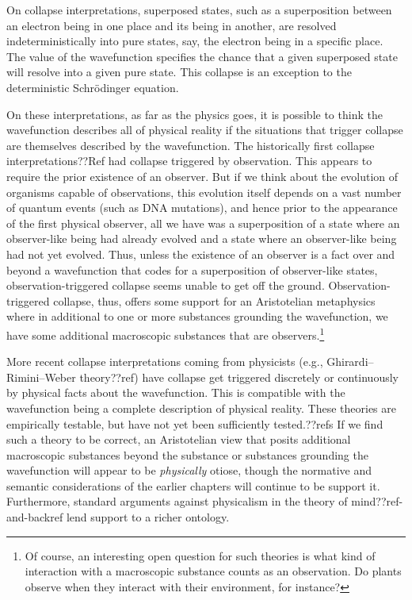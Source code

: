 On collapse interpretations, superposed states, such as a superposition between an electron being in one place and its 
being in another, are resolved indeterministically into pure states, say, the electron being in a specific place. The 
value of the wavefunction specifies the chance that a given superposed state will resolve into a given pure state. 
This collapse is an exception to the deterministic Schr\"{o}dinger equation.

On these interpretations, as far as the physics goes, it is possible to think the wavefunction describes all of physical 
reality if the situations that trigger collapse are themselves described by the wavefunction. The historically first collapse interpretations??Ref had collapse triggered by observation. This appears to require the prior existence of an observer. But if we think about 
the evolution of organisms capable of observations, this evolution itself depends on a vast number of quantum events (such 
as DNA mutations), and hence prior to the appearance of the first physical observer, all we have was a superposition 
of a state where an observer-like being had already evolved and a state where an observer-like being had not yet evolved. 
Thus, unless the existence of an observer is a fact over and beyond a wavefunction that codes for a superposition of 
observer-like states, observation-triggered collapse seems unable to get off the ground. Observation-triggered collapse,
thus, offers some support for an Aristotelian metaphysics where in additional to one or more substances grounding the 
wavefunction, we have some additional macroscopic substances that are observers.\footnote{Of course, an interesting open question for such theories is what kind of interaction with a macroscopic substance counts as an observation. Do plants observe when they interact
with their environment, for instance?}

More recent collapse interpretations coming from physicists (e.g., Ghirardi–Rimini–Weber theory??ref) have collapse get triggered discretely or continuously by physical facts about the wavefunction. This is compatible with the wavefunction being a 
complete description of physical reality. These theories are empirically testable, but have not yet been sufficiently
tested.??refs If we find such a theory to be correct, an Aristotelian view that posits additional macroscopic substances 
beyond the substance or substances grounding the wavefunction will appear to be \textit{physically} otiose, though the
normative and semantic considerations of the earlier chapters will continue to be support it. Furthermore, standard 
arguments against physicalism in the theory of mind??ref-and-backref lend support to a richer ontology.

